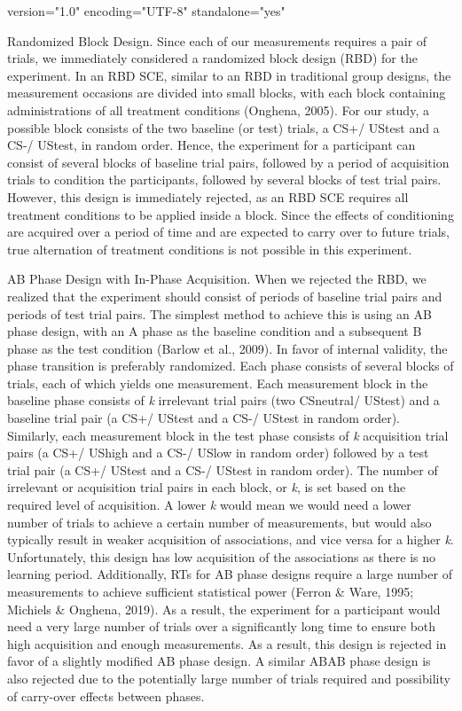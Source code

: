 version="1.0" encoding="UTF-8" standalone="yes" \documentclass{article}
\begin{document}
Randomized Block Design. Since each of our measurements requires a pair of trials, we immediately considered a randomized block design (RBD) for the experiment. In an RBD SCE, similar to an RBD in traditional group designs, the measurement occasions are divided into small blocks, with each block containing administrations of all treatment conditions (Onghena, 2005). For our study, a possible block consists of the two baseline (or test) trials, a CS+/ UStest and a CS-/ UStest, in random order. Hence, the experiment for a participant can consist of several blocks of baseline trial pairs, followed by a period of acquisition trials to condition the participants, followed by several blocks of test trial pairs. However, this design is immediately rejected, as an RBD SCE requires all treatment conditions to be applied inside a block. Since the effects of conditioning are acquired over a period of time and are expected to carry over to future trials, true alternation of treatment conditions is not possible in this experiment. 

AB Phase Design with In-Phase Acquisition. When we rejected the RBD, we realized that the experiment should consist of periods of baseline trial pairs and periods of test trial pairs. The simplest method to achieve this is using an AB phase design, with an A phase as the baseline condition and a subsequent B phase as the test condition (Barlow et al., 2009). In favor of internal validity, the phase transition is preferably randomized. Each phase consists of several blocks of trials, each of which yields one measurement. Each measurement block in the baseline phase consists of \emph{k} irrelevant trial pairs (two CSneutral/ UStest) and a baseline trial pair (a CS+/ UStest and a CS-/ UStest in random order). Similarly, each measurement block in the test phase consists of \emph{k} acquisition trial pairs (a CS+/ UShigh and a CS-/ USlow in random order) followed by a test trial pair (a CS+/ UStest and a CS-/ UStest in random order). The number of irrelevant or acquisition trial pairs in each block, or \emph{k}, is set based on the required level of acquisition. A lower \emph{k} would mean we would need a lower number of trials to achieve a certain number of measurements, but would also typically result in weaker acquisition of associations, and vice versa for a higher \emph{k}. Unfortunately, this design has low acquisition of the associations as there is no learning period. Additionally, RTs for AB phase designs require a large number of measurements to achieve sufficient statistical power (Ferron \& Ware, 1995; Michiels \& Onghena, 2019). As a result, the experiment for a participant would need a very large number of trials over a significantly long time to ensure both high acquisition and enough measurements. As a result, this design is rejected in favor of a slightly modified AB phase design. A similar ABAB phase design is also rejected due to the potentially large number of trials required and possibility of carry-over effects between phases. 
\end{document}
